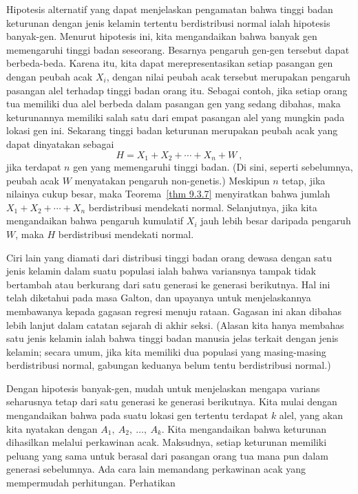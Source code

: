 Hipotesis alternatif yang dapat menjelaskan pengamatan bahwa tinggi badan keturunan dengan jenis
kelamin tertentu berdistribusi normal ialah hipotesis banyak-gen.
Menurut hipotesis ini, kita mengandaikan bahwa banyak gen memengaruhi tinggi badan seseorang.
Besarnya pengaruh gen-gen tersebut dapat berbeda-beda.  Karena itu, kita dapat merepresentasikan
setiap pasangan gen dengan peubah acak $X_i$, dengan nilai peubah acak tersebut merupakan pengaruh
pasangan alel terhadap tinggi badan orang itu.  Sebagai contoh, jika setiap orang tua memiliki dua
alel berbeda dalam pasangan gen yang sedang dibahas, maka keturunannya memiliki salah satu dari
empat pasangan alel yang mungkin pada lokasi gen ini.  Sekarang tinggi badan keturunan merupakan
peubah acak yang dapat dinyatakan sebagai
$$H = X_1 + X_2 + \cdots + X_n + W\ ,$$
jika terdapat $n$ gen yang memengaruhi tinggi badan.  (Di sini, seperti sebelumnya, peubah acak
$W$ menyatakan pengaruh non-genetis.)  Meskipun $n$ tetap, jika nilainya cukup besar, maka
Teorema~\ref{thm 9.3.7} menyiratkan bahwa jumlah $X_1 + X_2 + \cdots + X_n$ berdistribusi mendekati
normal.  Selanjutnya, jika kita mengandaikan bahwa pengaruh kumulatif $X_i$ jauh lebih besar
daripada pengaruh $W$, maka $H$ berdistribusi mendekati normal.
\par
Ciri lain yang diamati dari distribusi tinggi badan orang dewasa dengan satu jenis kelamin dalam
suatu populasi ialah bahwa variansnya tampak tidak bertambah atau berkurang dari satu generasi ke
generasi berikutnya.  Hal ini telah diketahui pada masa Galton, dan upayanya untuk menjelaskannya
membawanya kepada gagasan regresi menuju rataan.  Gagasan ini akan dibahas lebih lanjut dalam
catatan sejarah di akhir seksi.  (Alasan kita hanya membahas satu jenis kelamin ialah bahwa tinggi
badan manusia jelas terkait dengan jenis kelamin; secara umum, jika kita memiliki dua populasi
yang masing-masing berdistribusi normal, gabungan keduanya belum tentu berdistribusi normal.)
\par
Dengan hipotesis banyak-gen, mudah untuk menjelaskan mengapa varians seharusnya tetap dari satu
generasi ke generasi berikutnya.  Kita mulai dengan mengandaikan bahwa pada suatu lokasi gen
tertentu terdapat $k$ alel, yang akan kita nyatakan dengan $A_1,\ A_2,\ \ldots,\ A_k$.  Kita
mengandaikan bahwa keturunan dihasilkan melalui perkawinan acak.  Maksudnya, setiap keturunan
memiliki peluang yang sama untuk berasal dari pasangan orang tua mana pun dalam generasi
sebelumnya.  Ada cara lain memandang perkawinan acak yang mempermudah perhitungan.  Perhatikan
